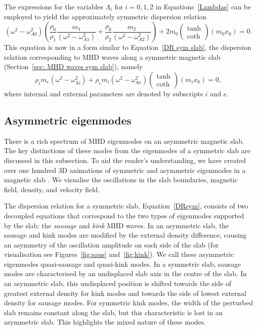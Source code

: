 \documentclass[12pt]{../style-files/ociamthesis}
\begin{document}
The expressions for the variables $\Lambda_i$ for $i=0,1,2$ in Equations~\eqref{Lambdas} can be employed to yield the approximately symmetric dispersion relation
\begin{equation}
(\omega^2 - \omega_{A0}^2)\left(\frac{\rho_0}{\rho_1}\frac{m_1}{(\omega^2 - \omega_{A1}^2)} + \frac{\rho_0}{\rho_2}\frac{m_2}{(\omega^2 - \omega_{A2}^2)}\right) + 2m_0\left(\begin{matrix}\tanh \\ \coth \end{matrix}\right)(m_0x_0) = 0. \label{DR approx}
\end{equation}
This equation is now in a form similar to Equation~\eqref{DR sym slab}, the dispersion relation corresponding to MHD waves along a symmetric magnetic slab (Section~\ref{sec: MHD waves sym slab}), namely
\begin{equation}
\rho_im_e(\omega^2 - \omega_\textrm{Ai}^2) + \rho_em_i(\omega^2 - \omega_\textrm{Ae}^2)\left(\begin{matrix}\tanh \\ \coth \end{matrix}\right)(m_ix_0) = 0, \label{DRsym}
\end{equation}
where internal and external parameters are denoted by subscripts $i$ and $e$.


\subsection{Asymmetric eigenmodes}
There is a rich spectrum of MHD eigenmodes on an asymmetric magnetic slab. The key distinctions of these modes from the eigenmodes of a symmetric slab are discussed in this subsection. To aid the reader's understanding, we have created over one hundred 3D animations of symmetric and asymmetric eigenmodes in a magnetic slab \cite{all_etal18c}. We visualise the oscillations in the slab boundaries, magnetic field, density, and velocity field.

The dispersion relation for a symmetric slab, Equation~\eqref{DRsym}, consists of two decoupled equations that correspond to the two types of eigenmodes supported by the slab: the \textit{sausage} and \textit{kink} MHD waves. In an asymmetric slab, the sausage and kink modes are modified by the external density difference, causing an asymmetry of the oscillation amplitude on each side of the slab (for visualisation see Figures~\ref{fig:saus} and~\ref{fig:kink}). We call these asymmetric eigenmodes quasi-sausage and quasi-kink modes. In a symmetric slab, sausage modes are characterised by an undisplaced slab axis in the centre of the slab. In an asymmetric slab, this undisplaced position is shifted towards the side of greatest external density for kink modes and towards the side of lowest external density for sausage modes. For symmetric kink modes, the width of the perturbed slab remains constant along the slab, but this characteristic is lost in an asymmetric slab. This highlights the mixed nature of these modes. 
\end{document}
